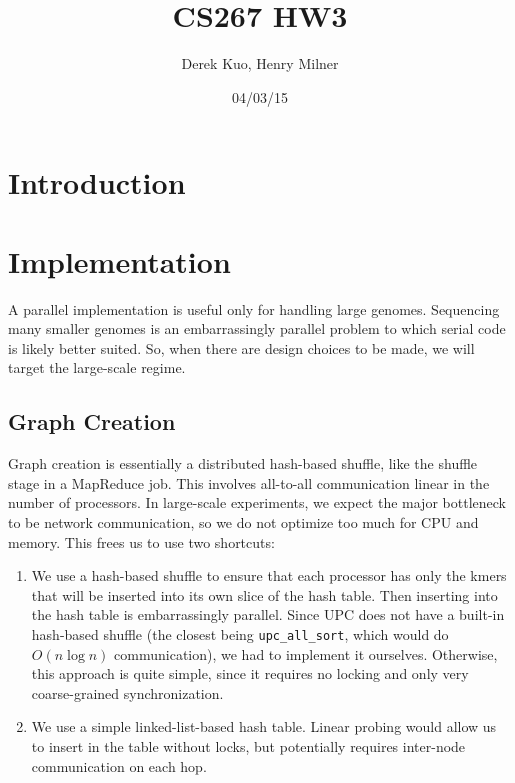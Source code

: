 \documentclass{article}
\author{Derek Kuo, Henry Milner}
\title{CS267 HW3}
\date{04/03/15}
\begin{document}
\maketitle

\section{Introduction}

\section{Implementation}
A parallel implementation is useful only for handling large genomes.  Sequencing many smaller genomes is an embarrassingly parallel problem to which serial code is likely better suited.  So, when there are design choices to be made, we will target the large-scale regime.

\subsection{Graph Creation}
Graph creation is essentially a distributed hash-based shuffle, like the shuffle stage in a MapReduce job.  This involves all-to-all communication linear in the number of processors.  In large-scale experiments, we expect the major bottleneck to be network communication, so we do not optimize too much for CPU and memory.  This frees us to use two shortcuts:
\begin{enumerate}
  \item We use a hash-based shuffle to ensure that each processor has only the kmers that will be inserted into its own slice of the hash table.  Then inserting into the hash table is embarrassingly parallel.  Since UPC does not have a built-in hash-based shuffle (the closest being \texttt{upc\_all\_sort}, which would do $O(n \log n)$ communication), we had to implement it ourselves.  Otherwise, this approach is quite simple, since it requires no locking and only very coarse-grained synchronization.
  \item We use a simple linked-list-based hash table.  Linear probing would allow us to insert in the table without locks, but potentially requires inter-node communication on each hop.
\end{enumerate}
\end{document}
